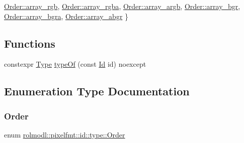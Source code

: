 \begin{DoxyCompactItemize}
\mbox{\hyperlink{namespacerolmodl_1_1pixelfmt_1_1id_1_1type_a01a03db37a556bc98643bd88b2f5b6b3a210383d32dc9bfa922c7110daf340c1e}{Order\+::array\+\_\+rgb}}, 
\mbox{\hyperlink{namespacerolmodl_1_1pixelfmt_1_1id_1_1type_a01a03db37a556bc98643bd88b2f5b6b3a9df8e64bef199cbeb5feade883d292df}{Order\+::array\+\_\+rgba}}, 
\mbox{\hyperlink{namespacerolmodl_1_1pixelfmt_1_1id_1_1type_a01a03db37a556bc98643bd88b2f5b6b3ad9ebeb4cd248be2b361ab692b7ac331c}{Order\+::array\+\_\+argb}}, 
\newline
\mbox{\hyperlink{namespacerolmodl_1_1pixelfmt_1_1id_1_1type_a01a03db37a556bc98643bd88b2f5b6b3a4e4267ef076856fba01b85ff83b1d8cc}{Order\+::array\+\_\+bgr}}, 
\mbox{\hyperlink{namespacerolmodl_1_1pixelfmt_1_1id_1_1type_a01a03db37a556bc98643bd88b2f5b6b3ad3821dd1ccadf206cbb3681cd24181e9}{Order\+::array\+\_\+bgra}}, 
\mbox{\hyperlink{namespacerolmodl_1_1pixelfmt_1_1id_1_1type_a01a03db37a556bc98643bd88b2f5b6b3a2b880b9c95a1f63d15c56530f6d8185f}{Order\+::array\+\_\+abgr}}
 \}
\end{DoxyCompactItemize}
\subsection*{Functions}
\begin{DoxyCompactItemize}
\item 
constexpr \mbox{\hyperlink{namespacerolmodl_1_1pixelfmt_1_1id_acacda2442a2997fe425e2faa4e5d002b}{Type}} \mbox{\hyperlink{namespacerolmodl_1_1pixelfmt_1_1id_1_1type_a596cef7a0a679871d05bddafd7d38226}{type\+Of}} (const \mbox{\hyperlink{namespacerolmodl_1_1pixelfmt_a96282713e4465ba9211c8fd3a702b52b}{Id}} id) noexcept
\end{DoxyCompactItemize}


\subsection{Enumeration Type Documentation}
\mbox{\label{namespacerolmodl_1_1pixelfmt_1_1id_1_1type_a01a03db37a556bc98643bd88b2f5b6b3}} 
\subsubsection{\texorpdfstring{Order}{Order}}
{\footnotesize\ttfamily enum \mbox{\hyperlink{namespacerolmodl_1_1pixelfmt_1_1id_1_1type_a01a03db37a556bc98643bd88b2f5b6b3}{rolmodl\+::pixelfmt\+::id\+::type\+::\+Order}}\hspace{0.3cm}{\ttfamily [strong]}}

